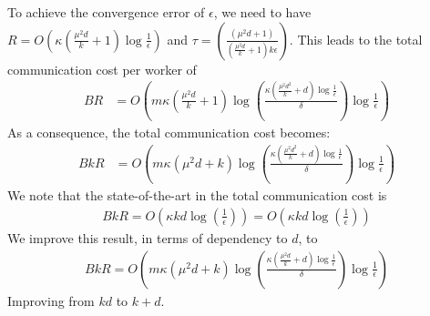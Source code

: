\begin{corollary}
To achieve the convergence error of $\epsilon$, we need to have $R=O\left(\kappa(\frac{\mu^2d}{k}+1)\log\frac{1}{\epsilon}\right)$ and $\tau=\left(\frac{(\mu^2d+1)}{(\frac{\mu^2d}{k}+1)k\epsilon}\right)$. This leads to the total communication cost per worker of 
\begin{align}
BR&=O\left(m\kappa(\frac{\mu^2d}{k}+1)\log\left(\frac{\kappa(\frac{\mu^2d^2}{k}+d)\log\frac{1}{\epsilon}}{\delta}\right)\log\frac{1}{\epsilon} \right)
\end{align}
As a consequence, the total communication cost becomes:
\begin{align}
BkR&=O\left(m\kappa(\mu^2d+k)\log\left(\frac{\kappa(\frac{\mu^2d^2}{k}+d)\log\frac{1}{\epsilon}}{\delta}\right)\log\frac{1}{\epsilon} \right)
\end{align}
We note that the state-of-the-art in \cite{karimireddy2019scaffold} the total communication cost is 
\begin{align}
    BkR=O\left(\kappa kd\log\left(\frac{1}{\epsilon}\right) \right)=O\left(\kappa kd\log\left(\frac{1}{\epsilon}\right)\right) 
\end{align}
We improve this result, in terms of dependency to $d$, to 
\begin{align}
    BkR=O\left(m\kappa(\mu^2d+k)\log\left(\frac{\kappa(\frac{\mu^2d}{k}+d)\log\frac{1}{\epsilon}}{\delta}\right)\log\frac{1}{\epsilon} \right)
\end{align}
Improving from $kd$ to $k+d$.
\end{corollary}





